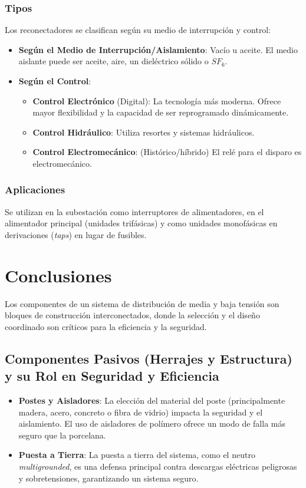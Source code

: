\subsubsection*{Tipos}
Los reconectadores se clasifican según su medio de interrupción y control:
\begin{itemize}
    \item \textbf{Según el Medio de Interrupción/Aislamiento}: Vacío u aceite. El medio aislante puede ser aceite, aire, un dieléctrico sólido o $SF_6$.
    \item \textbf{Según el Control}:
    \begin{itemize}
        \item \textbf{Control Electrónico} (Digital): La tecnología más moderna. Ofrece mayor flexibilidad y la capacidad de ser reprogramado dinámicamente.
        \item \textbf{Control Hidráulico}: Utiliza resortes y sistemas hidráulicos.
        \item \textbf{Control Electromecánico}: (Histórico/híbrido) El relé para el disparo es electromecánico.
    \end{itemize}
\end{itemize}

\subsubsection*{Aplicaciones}
Se utilizan en la subestación como interruptores de alimentadores, en el alimentador principal (unidades trifásicas) y como unidades monofásicas en derivaciones (\textit{taps}) en lugar de fusibles.

\section*{Conclusiones}

Los componentes de un sistema de distribución de media y baja tensión son bloques de construcción interconectados, donde la selección y el diseño coordinado son críticos para la eficiencia y la seguridad.

\subsection*{Componentes Pasivos (Herrajes y Estructura) y su Rol en Seguridad y Eficiencia}
\begin{itemize}
    \item \textbf{Postes y Aisladores}: La elección del material del poste (principalmente madera, acero, concreto o fibra de vidrio) impacta la seguridad y el aislamiento. El uso de aisladores de polímero ofrece un modo de falla más seguro que la porcelana.
    \item \textbf{Puesta a Tierra}: La puesta a tierra del sistema, como el neutro \textit{multigrounded}, es una defensa principal contra descargas eléctricas peligrosas y sobretensiones, garantizando un sistema seguro.
\end{itemize}

